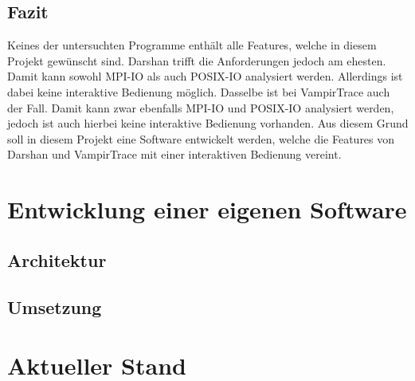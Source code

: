 \section{Fazit}
Keines der untersuchten Programme enth\"alt alle Features, welche in diesem Projekt gew\"unscht sind. Darshan trifft die Anforderungen jedoch am ehesten. Damit kann sowohl MPI-IO als auch POSIX-IO analysiert werden. Allerdings ist dabei keine interaktive Bedienung m\"oglich. Dasselbe ist bei VampirTrace auch der Fall. Damit kann zwar ebenfalls MPI-IO und POSIX-IO analysiert werden, jedoch ist auch hierbei keine interaktive Bedienung vorhanden. Aus diesem Grund soll in diesem Projekt eine Software entwickelt werden, welche die Features von Darshan und VampirTrace mit einer interaktiven Bedienung vereint.

\chapter{Entwicklung einer eigenen Software}
\section{Architektur}
\label{sec:real}

\section{Umsetzung}
\label{sec:umsetz}

\chapter{Aktueller Stand}
\label{sec:ergeb}


